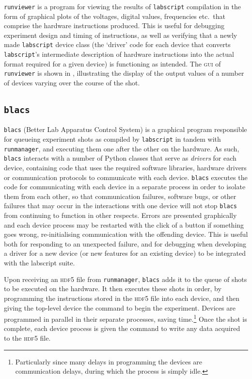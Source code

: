\texttt{runviewer} is a program for viewing the results of \texttt{labscript} compilation in the form of graphical plots of the voltages, digital values, frequencies etc.~that comprise the hardware instructions produced. This is useful for debugging experiment design and timing of instructions, as well as verifying that a newly made \texttt{labscript} device class (the `driver' code for each device that converts \texttt{labscript}'s intermediate description of hardware instructions into the actual format required for a given device) is functioning as intended. The \textsc{gui} of \texttt{runviewer} is shown in , illustrating the display of the output values of a number of devices varying over the course of the shot.

\subsection{\texttt{blacs}}

\texttt{blacs} (Better Lab Apparatus Control System) is a graphical program responsible for queueing experiment shots as compiled by \texttt{labscript} in tandem with \texttt{runmanager}, and executing them one after the other on the hardware. As such, \texttt{blacs} interacts with a number of Python classes that serve as \emph{drivers} for each device, containing code that uses the required software libraries, hardware drivers or communication protocols to communicate with each device. \texttt{blacs} executes the code for communicating with each device in a separate process in order to isolate them from each other, so that communication failures, software bugs, or other failures that may occur in the interactions with one device will not stop \texttt{blacs} from continuing to function in other respects. Errors are presented graphically and each device process may be restarted with the click of a button if something goes wrong, re-initialising communication with the offending device. This is useful both for responding to an unexpected failure, and for debugging when developing a driver for a new device (or new features for an existing device) to be integrated with the labscript suite.

Upon receiving an \textsc{hdf5} file from \texttt{runmanager}, \texttt{blacs} adds it to the queue of shots to be executed on the hardware. It then executes these shots in order, by programming the instructions stored in the \textsc{hdf5} file into each device, and then giving the top-level device the command to begin the experiment. Devices are programmed in parallel in their separate processes, saving time.\footnote{Particularly since many delays in programming the devices are communication delays, during which the process is simply idle.} Once the shot is complete, each device process is given the command to write any data acquired to the \textsc{hdf5} file.

